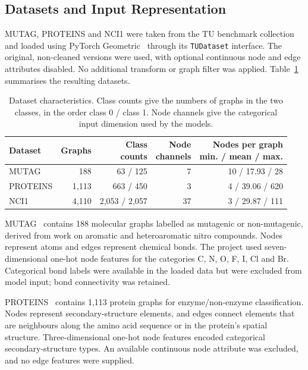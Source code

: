 \documentclass[11pt,a4paper]{article}
\begin{document}
\subsection{Datasets and Input Representation}
\label{sec:datasets}

MUTAG, PROTEINS and NCI1 were taken from the TU benchmark collection~\cite{morris2020tudataset} and loaded using PyTorch Geometric~\cite{fey2019pyg} through its \texttt{TUDataset} interface. The original, non-cleaned versions were used, with optional continuous node and edge attributes disabled. No additional transform or graph filter was applied. Table~\ref{tab:datasets} summarises the resulting datasets.

\begin{table}[!ht]
\centering
\caption{Dataset characteristics. Class counts give the numbers of graphs in the two classes, in the order class 0 / class 1. Node channels give the categorical input dimension used by the models.}
\label{tab:datasets}
\small
\begin{tabular}{@{}lrrrr@{}}
\toprule
Dataset & Graphs & \shortstack{Class\\counts} & \shortstack{Node\\channels} & \shortstack{Nodes per graph\\min. / mean / max.}\\
\midrule
MUTAG & 188 & 63 / 125 & 7 & 10 / 17.93 / 28\\
PROTEINS & 1,113 & 663 / 450 & 3 & 4 / 39.06 / 620\\
NCI1 & 4,110 & 2,053 / 2,057 & 37 & 3 / 29.87 / 111\\
\bottomrule
\end{tabular}
\end{table}

MUTAG~\cite{debnath1991structure} contains 188 molecular graphs labelled as mutagenic or non-mutagenic, derived from work on aromatic and heteroaromatic nitro compounds. Nodes represent atoms and edges represent chemical bonds. The project used seven-dimensional one-hot node features for the categories C, N, O, F, I, Cl and Br. Categorical bond labels were available in the loaded data but were excluded from model input; bond connectivity was retained.

PROTEINS~\cite{borgwardt2005protein} contains 1,113 protein graphs for enzyme/non-enzyme classification. Nodes represent secondary-structure elements, and edges connect elements that are neighbours along the amino acid sequence or in the protein's spatial structure. Three-dimensional one-hot node features encoded categorical secondary-structure types. An available continuous node attribute was excluded, and no edge features were supplied.
\end{document}
